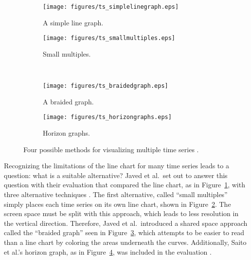 \documentclass{article}
\begin{document}
\begin{figure}
        \centering
        \begin{subfigure}[b]{0.4\textwidth}
                \texttt{[image: figures/ts\_simplelinegraph.eps]}
                \caption{A simple line graph.}
                \label{fig:ts_simple}
        \end{subfigure}
        \begin{subfigure}[b]{0.4\textwidth}
                \texttt{[image: figures/ts\_smallmultiples.eps]}
                \caption{Small multiples.}
                \label{fig:ts_smmult}
        \end{subfigure}
        \\
        \begin{subfigure}[b]{0.4\textwidth}
                \texttt{[image: figures/ts\_braidedgraph.eps]}
                \caption{A braided graph.}
                \label{fig:ts_braid}
        \end{subfigure}
        \begin{subfigure}[b]{0.4\textwidth}
                \texttt{[image: figures/ts\_horizongraphs.eps]}
                \caption{Horizon graphs.}
                \label{fig:ts_horizon}
        \end{subfigure}
        \caption{Four possible methods for visualizing multiple time series \cite{javed2010}.}
        \label{fig:ts_compare}
\end{figure}

Recognizing the limitations of the line chart for many time series leads to a question: what is a suitable alternative?  Javed et al.\ set out to answer this question with their evaluation that compared the line chart, as in Figure~\ref{fig:ts_simple}, with three alternative techniques  \cite{javed2010}.  The first alternative, called ``small multiples'' simply places each time series on its own line chart, shown in Figure~\ref{fig:ts_smmult}.  The screen space must be split with this approach, which leads to less resolution in the vertical direction.  Therefore, Javed et al.\ introduced a shared space approach called the ``braided graph'' seen in Figure~\ref{fig:ts_braid}, which attempts to be easier to read than a line chart by coloring the areas underneath the curves.  Additionally, Saito et al.'s horizon graph, as in Figure~\ref{fig:ts_horizon}, was included in the evaluation \cite{saito2005}.
\end{document}

